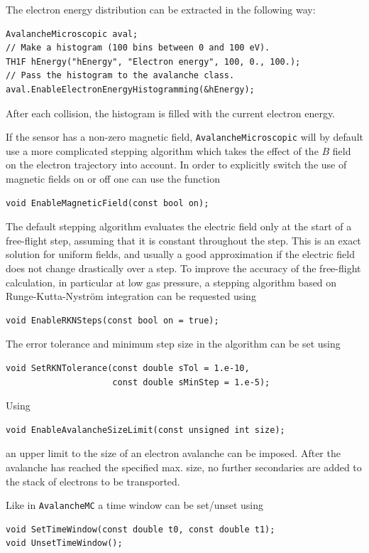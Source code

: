 The electron energy distribution can be extracted in the following way:
\begin{lstlisting}
AvalancheMicroscopic aval;
// Make a histogram (100 bins between 0 and 100 eV).
TH1F hEnergy("hEnergy", "Electron energy", 100, 0., 100.);
// Pass the histogram to the avalanche class.
aval.EnableElectronEnergyHistogramming(&hEnergy);
\end{lstlisting} 
After each collision, 
the histogram is filled with the current electron energy. 

If the sensor has a non-zero magnetic field, \texttt{AvalancheMicroscopic} 
will by default use a more complicated stepping algorithm which takes
the effect of the $B$ field on the electron trajectory into account.
In order to explicitly switch the use of magnetic fields on or off 
one can use the function
\begin{lstlisting}
void EnableMagneticField(const bool on);
\end{lstlisting}

The default stepping algorithm evaluates the electric field only at the start of a free-flight step, assuming that it is constant throughout the step. This is an exact solution for uniform fields, and usually a good approximation if the electric field does not change drastically over a step.
To improve the accuracy of the free-flight calculation, in particular at low gas pressure, a stepping algorithm based on Runge-Kutta-Nystr\"om integration can be requested using 
\begin{lstlisting}
void EnableRKNSteps(const bool on = true);
\end{lstlisting}
The error tolerance and minimum step size in the algorithm can be set using
\begin{lstlisting}
void SetRKNTolerance(const double sTol = 1.e-10,
                     const double sMinStep = 1.e-5);
\end{lstlisting}

Using 
\begin{lstlisting}
void EnableAvalancheSizeLimit(const unsigned int size);
\end{lstlisting}
an upper limit to the size of an electron avalanche can be imposed.
After the avalanche has reached the specified max. size, 
no further secondaries are added to the stack of electrons to be transported.  

Like in \texttt{AvalancheMC} a time window can be set/unset using
\begin{lstlisting}
void SetTimeWindow(const double t0, const double t1);
void UnsetTimeWindow();
\end{lstlisting}

